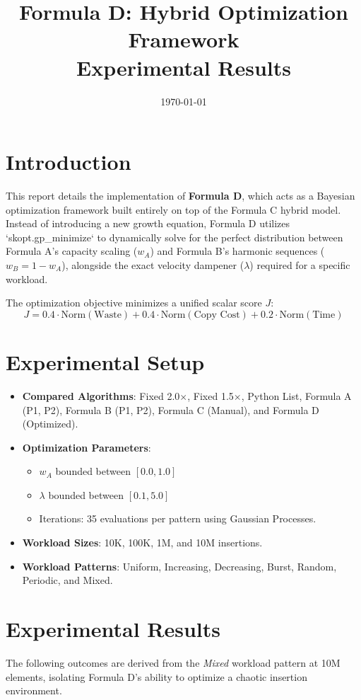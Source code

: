 \documentclass[11pt, a4paper]{article}
\title{Formula D: Hybrid Optimization Framework \\ Experimental Results}
\author{}
\date{\today}
\begin{document}
\maketitle
\tableofcontents
\listoffigures
\listoftables
\newpage

\section{Introduction}
This report details the implementation of \textbf{Formula D}, which acts as a Bayesian optimization framework built entirely on top of the Formula C hybrid model. Instead of introducing a new growth equation, Formula D utilizes `skopt.gp_minimize` to dynamically solve for the perfect distribution between Formula A's capacity scaling ($w_A$) and Formula B's harmonic sequences ($w_B = 1 - w_A$), alongside the exact velocity dampener ($\lambda$) required for a specific workload.

The optimization objective minimizes a unified scalar score $J$:
$$ J = 0.4 \cdot \text{Norm}(\text{Waste}) + 0.4 \cdot \text{Norm}(\text{Copy Cost}) + 0.2 \cdot \text{Norm}(\text{Time}) $$

\section{Experimental Setup}
\begin{itemize}
    \item \textbf{Compared Algorithms}: Fixed 2.0$\times$, Fixed 1.5$\times$, Python List, Formula A (P1, P2), Formula B (P1, P2), Formula C (Manual), and Formula D (Optimized).
    \item \textbf{Optimization Parameters}:
        \begin{itemize}
            \item $w_A$ bounded between $[0.0, 1.0]$
            \item $\lambda$ bounded between $[0.1, 5.0]$
            \item Iterations: 35 evaluations per pattern using Gaussian Processes.
        \end{itemize}
    \item \textbf{Workload Sizes}: 10K, 100K, 1M, and 10M insertions.
    \item \textbf{Workload Patterns}: Uniform, Increasing, Decreasing, Burst, Random, Periodic, and Mixed.
\end{itemize}

\section{Experimental Results}
The following outcomes are derived from the \textit{Mixed} workload pattern at 10M elements, isolating Formula D's ability to optimize a chaotic insertion environment.
\end{document}
